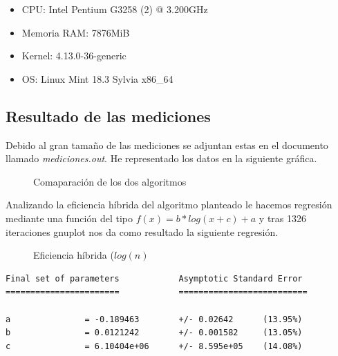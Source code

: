 \documentclass{article}
\begin{document}
\begin{itemize}
\item CPU: Intel Pentium G3258 (2) @ 3.200GHz
\item Memoria RAM: 7876MiB
\item Kernel: 4.13.0-36-generic
\item OS: Linux Mint 18.3 Sylvia x86\_64
\end{itemize}

\subsection{Resultado de las mediciones}

Debido al gran tamaño de las mediciones se adjuntan estas en el
documento llamado \textit{mediciones.out}. He representado los datos
en la siguiente gráfica.

\begin{figure}[H]
  \centering   

\caption{Comaparación de los dos algoritmos}
\end{figure}

Analizando la eficiencia híbrida del algoritmo planteado le hacemos
regresión mediante una función del tipo $f(x) = b*log(x+c)+a$ y tras
1326 iteraciones gnuplot nos da como resultado la siguiente regresión.

\begin{figure}[H]
  \centering   

\caption{Eficiencia híbrida ($log(n)$}
\end{figure}

\begin{verbatim}
Final set of parameters            Asymptotic Standard Error
=======================            ==========================

a               = -0.189463        +/- 0.02642      (13.95%)
b               = 0.0121242        +/- 0.001582     (13.05%)
c               = 6.10404e+06      +/- 8.595e+05    (14.08%)
\end{verbatim}
\end{document}
